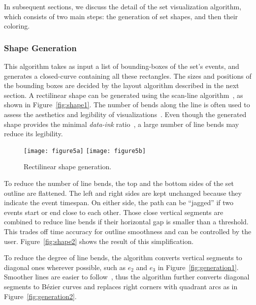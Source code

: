 In subsequent sections, we discuss the detail of the set visualization algorithm, which consists of two main steps: the generation of set shapes, and then their coloring.

\subsubsection{Shape Generation}
\label{sub:shapesgeneration}
This algorithm takes as input a list of bounding-boxes of the set's events, and generates a closed-curve containing all these rectangles. The sizes and positions of the bounding boxes are decided by the layout algorithm described in the next section. A rectilinear shape can be generated using the scan-line algorithm~\cite{Foley1997}, as shown in Figure~\ref{fig:shape1}. The number of bends along the line is often used to assess the aesthetics and legibility of visualizations~\cite{Tanahashi2012}. Even though the generated shape provides the minimal \textit{data-ink} ratio~\cite{Tufte1986}, a large number of line bends may reduce its legibility. 

\begin{figure}[ht]
	\centering
		{\texttt{[image: figure5a]}}\label{fig:shape1}
	\hfill
		{\texttt{[image: figure5b]}}\label{fig:shape2}
	\caption{Rectilinear shape generation.}
	\label{fig:shape}
\end{figure}

To reduce the number of line bends, the top and the bottom sides of the set outline are flattened. The left and right sides  are kept unchanged because they indicate the event timespan. On either side, the path can be ``jagged'' if two events start or end close to each other. Those close vertical segments are combined to reduce line bends if their horizontal gap is smaller than a threshold. This trades off time accuracy for outline smoothness and can be controlled by the user. Figure~\ref{fig:shape2} shows the result of this simplification. 

To reduce the degree of line bends, the algorithm converts vertical segments to diagonal ones wherever possible, such as  $e_2$ and $e_3$ in Figure~\ref{fig:generation1}. Smoother lines are easier to follow~\cite{Kim2010}, thus the algorithm further converts diagonal segments to B\'{e}zier curves and replaces right corners with quadrant arcs as in Figure~\ref{fig:generation2}.


